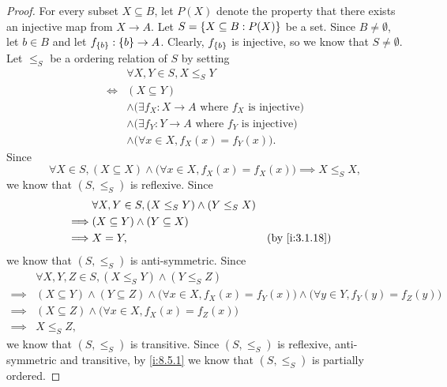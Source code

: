 \begin{proof}
  For every subset \(X \subseteq B\), let \(P(X)\) denote the property that there exists an injective map from \(X \to A\).
  Let \(S = \left\lbrace X \subseteq B : P(X)\right\rbrace\) be a set.
  Since \(B \neq \emptyset\), let \(b \in B\) and let \(f_{\left\lbrace b\right\rbrace} : \left\lbrace b\right\rbrace \to A\).
  Clearly, \(f_{\left\lbrace b\right\rbrace}\) is injective, so we know that \(S \neq \emptyset\).
  Let \(\leq_S\) be a ordering relation of \(S\) by setting
  \begin{align*}
         & \forall X, Y \in S, X \leq_S Y                                           \\
    \iff & (X \subseteq Y)                                                          \\
         & \land \big(\exists f_X : X \to A \text{ where \(f_X\) is injective}\big) \\
         & \land \big(\exists f_Y : Y \to A \text{ where \(f_Y\) is injective}\big) \\
         & \land \big(\forall x \in X, f_X(x) = f_Y(x)\big).
  \end{align*}
  Since
  \[
    \forall X \in S, (X \subseteq X) \land \big(\forall x \in X, f_X(x) = f_X(x)\big) \implies X \leq_S X,
  \]
  we know that \((S, \leq_S)\) is reflexive.
  Since
  \begin{align*}
             & \forall X, Y \in S, (X \leq_S Y) \land (Y \leq_S X)                    \\
    \implies & (X \subseteq Y) \land (Y \subseteq X)                                  \\
    \implies & X = Y,                                              &  & \by{i:3.1.18}
  \end{align*}
  we know that \((S, \leq_S)\) is anti-symmetric.
  Since
  \begin{align*}
             & \forall X, Y, Z \in S, (X \leq_S Y) \land (Y \leq_S Z)                                                                                  \\
    \implies & (X \subseteq Y) \land (Y \subseteq Z) \land \big(\forall x \in X, f_X(x) = f_Y(x)\big) \land \big(\forall y \in Y, f_Y(y) = f_Z(y)\big) \\
    \implies & (X \subseteq Z) \land \big(\forall x \in X, f_X(x) = f_Z(x)\big)                                                                        \\
    \implies & X \leq_S Z,
  \end{align*}
  we know that \((S, \leq_S)\) is transitive.
  Since \((S, \leq_S)\) is reflexive, anti-symmetric and transitive, by \cref{i:8.5.1} we know that \((S, \leq_S)\) is partially ordered.


\end{proof}
